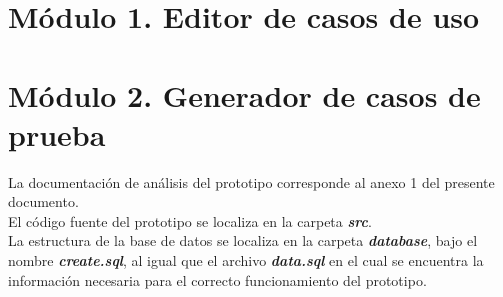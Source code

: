 
\section{Módulo 1. Editor de casos de uso}

\section{Módulo 2. Generador de casos de prueba}

	La documentación de análisis del prototipo corresponde al anexo 1 del presente documento.\\

	El código fuente del prototipo se localiza en la carpeta {\bf \it src}.\\
	
	La estructura de la base de datos se localiza en la carpeta {\bf \it database}, bajo el nombre {\bf \it create.sql}, al igual que el archivo {\bf \it data.sql} en el cual se encuentra la información necesaria para el correcto funcionamiento del prototipo. 